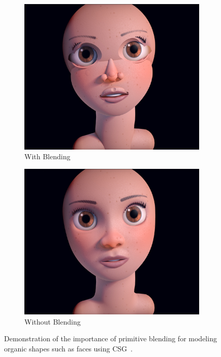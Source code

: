 \begin{figure}
	\centering
	\begin{subfigure}[t]{0.45\textwidth}
		\centering
		\includegraphics[width=\textwidth]{Images/Face without blending}
		\caption{With Blending}
	\end{subfigure}
	\hfill
	\begin{subfigure}[t]{0.45\textwidth}
		\centering
		\includegraphics[width=\textwidth]{Images/Face with blending}
		\caption{Without Blending}
	\end{subfigure}
	\caption{Demonstration of the importance of primitive blending for modeling organic shapes such as faces using CSG~\cite{Quilez2013}.}
	\label{fig:primitive_blending}
\end{figure}

